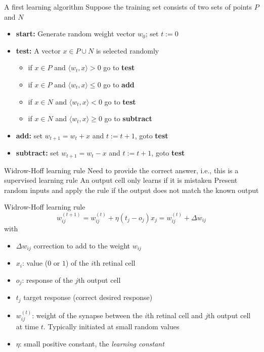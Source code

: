 \documentclass[aspectratio=169]{beamer}\usepackage[]{graphicx}\usepackage[]{xcolor}
\begin{document}
\begin{frame}{A first learning algorithm}
    Suppose the training set consists of two sets of points $P$ and $N$
    \vfill
    \begin{itemize}
        \item \textbf{start:} Generate random weight vector $w_0$; set $t := 0$
        \vfill
        \item \textbf{test:} A vector $x\in P\cup N$ is selected randomly
        \begin{itemize}
            \item if $x\in P$ and $\langle w_t,x\rangle > 0$ go to \textbf{test}
            \item if $x\in P$ and $\langle w_t,x\rangle\leq 0$ go to \textbf{add}
            \item if $x\in N$ and $\langle w_t,x\rangle < 0$ go to \textbf{test}
            \item if $x\in N$ and $\langle w_t,x\rangle \geq 0$ go to \textbf{subtract}
        \end{itemize}
        \vfill
        \item \textbf{add:} set $w_{t+1} = w_t + x$ and $t := t + 1$, goto \textbf{test}
        \vfill
        \item \textbf{subtract:} set $w_{t+1} = w_t - x$ and $t := t + 1$, goto \textbf{test}
    \end{itemize}
\end{frame}

\begin{frame}{Widrow-Hoff learning rule}
    Need to provide the correct answer, i.e., this is a supervised learning rule
    \vfill
    An output cell only learns if it is mistaken
    \vfill
    Present random inputs and apply the rule if the output does not match the known output
\end{frame}

\begin{frame}{Widrow-Hoff learning rule}
    \begin{equation}\label{eq:WidrowHoff}
        w_{ij}^{(t+1)} = w_{ij}^{(t)}+\eta(t_j-o_j)x_j = w_{ij}^{(t)}+\Delta w_{ij}        
    \end{equation}
    with
    \begin{itemize}
        \item $\Delta w_{ij}$ correction to add to the weight $w_{ij}$
        \item $x_i$: value ($0$ or $1$) of the $i$th retinal cell
        \item $o_j$: response of the $j$th output cell
        \item $t_j$ target response (correct desired response)
        \item $w_{ij}^{(t)}$: weight of the synapse between the $i$th retinal cell and $j$th output cell at time $t$. Typically initiated at small random values
        \item $\eta$: small positive constant, the \emph{learning constant}
    \end{itemize} 
\end{frame}
\end{document}
